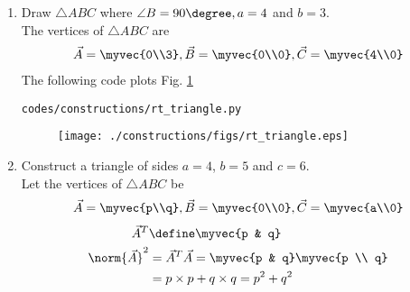 \renewcommand{\theequation}{\theenumi}
\begin{enumerate}[label=\arabic*.,ref=\thesubsection.\theenumi]

\item Draw $\triangle ABC$ where $\angle B = 90\degree, a = 4$ and $b = 3$.
\\
\solution The vertices of $\triangle ABC$ are 
\begin{align}
\vec{A} = \myvec{0\\3}, \vec{B} = \myvec{0\\0}, \vec{C} = \myvec{4\\0}
\end{align}
%
The following code plots Fig. \ref{fig:rt_triangle}
\begin{lstlisting}
codes/constructions/rt_triangle.py
\end{lstlisting}
\begin{figure}[!ht]
\texttt{[image: ./constructions/figs/rt\_triangle.eps]}
\caption{}
\label{fig:rt_triangle}
\end{figure}
\item Construct a triangle of sides $a=4$, $b=5$  and $c=6$.  
\label{prob:tri}
\\
\solution Let the vertices of  $\triangle ABC$ be 
\begin{align}
\label{eq:tri_basic}
\vec{A} = \myvec{p\\q}, \vec{B} = \myvec{0\\0}, \vec{C} = \myvec{a\\0}
\end{align}
%
\begin{align}
\label{eq:vec_def}
\vec{A}^T &\define \myvec{p & q}
\\
\norm{\vec{A}}^2 &= \vec{A}^T\vec{A} = \myvec{p & q}\myvec{p \\ q}
\\
&= p\times p + q\times q = p^2+q^2
\end{align}


\end{enumerate}
